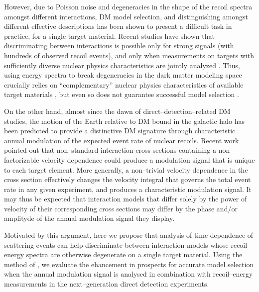 \documentclass[11pt]{article}
\begin{document}
However, due to Poisson noise and degeneracies in the shape of the recoil spectra amongst different interactions, DM model selection, and distinguishing amongst different effective descriptions has been shown to present a difficult task in practice, for a single target material. Recent studies have shown that discriminating between interactions is possible only for strong signals (with hundreds of observed recoil events), and only when measurements on targets with sufficiently diverse nuclear physics characteristics are jointly analyzed \cite{}. Thus, using energy spectra to break degeneracies in the dark matter modeling space crucially relies on ``complementary'' nuclear physics characteristics of available target materials \cite{McDermott:2011hx,Peter:2013aha,Gluscevic:2014vga,Catena:2014epa,Catena:2014hla,Dent:2015zpa,Gluscevic:2015sqa,Ruppin:2014bra}, but even so does not guarantee successful model selection \cite{Gluscevic:2014vga}.

On the other hand, almost since the dawn of direct--detection--related DM studies, the motion of the Earth relative to DM bound in the galactic halo has been predicted to provide a distinctive DM signature \cite{Freese:1987wu, Freese:2012xd,Lee:2013xxa,Britto:2014wga,DelNobile:2015nua,Kouvaris:2015xga} through characteristic annual modulation of the expected event rate of nuclear recoils. Recent work \cite{DelNobile:2015tza,DelNobile:2015rmp} pointed out that non--standard interaction cross sections containing a non--factorizable velocity dependence could produce a modulation signal that is unique to each target element. More generally, a non--trivial velocity dependence in the cross section effectively changes the velocity integral that governs the total event rate in any given experiment, and produces a characteristic modulation signal. It may thus be expected that interaction models that differ solely by the power of velocity of their corresponding cross sections may differ by the phase and/or amplityde of the annual modulation signal they display. 

Motivated by this argument, here we propose that analysis of time dependence of scattering events can help discriminate between interaction models whose recoil energy spectra are otherwise degenerate on a single target material. Using the method of \cite{}, we evaluate the ehancement in prospects for accurate model selection when the annual modulation signal is analysed in combination with recoil--energy measurements in the next--generation direct detection experiments. 
\end{document}
